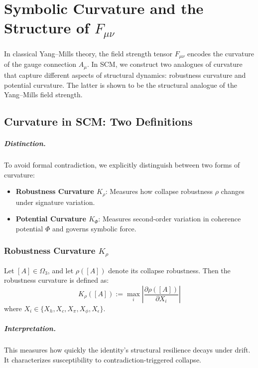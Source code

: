 \chapter{Symbolic Curvature and the Structure of \texorpdfstring{$F_{\mu\nu}$}{F\_\{mu nu\}}} \label{chapter-symbolic-curvature}

In classical Yang--Mills theory, the field strength tensor \( F_{\mu\nu} \) encodes the curvature of the gauge connection \( A_\mu \). In SCM, we construct two analogues of curvature that capture different aspects of structural dynamics: robustness curvature and potential curvature. The latter is shown to be the structural analogue of the Yang--Mills field strength.

\section{Curvature in SCM: Two Definitions}

\paragraph{Distinction.}
To avoid formal contradiction, we explicitly distinguish between two forms of curvature:

\begin{itemize}
  \item \textbf{Robustness Curvature \( K_\rho \)}: Measures how collapse robustness \( \rho \) changes under signature variation.
  \item \textbf{Potential Curvature \( K_\Phi \)}: Measures second-order variation in coherence potential \( \Phi \) and governs symbolic force.
\end{itemize}

\subsection{Robustness Curvature \( K_\rho \)}

\begin{definition}
Let \( [A] \in \Omega_3 \), and let \( \rho([A]) \) denote its collapse robustness. Then the robustness curvature is defined as:
\[
K_\rho([A]) := \max_i \left| \frac{\partial \rho([A])}{\partial X_i} \right|
\]
where \( X_i \in \{ X_h, X_c, X_\pi, X_\phi, X_\epsilon \} \).
\end{definition}

\paragraph{Interpretation.}
This measures how quickly the identity’s structural resilience decays under drift. It characterizes susceptibility to contradiction-triggered collapse.

